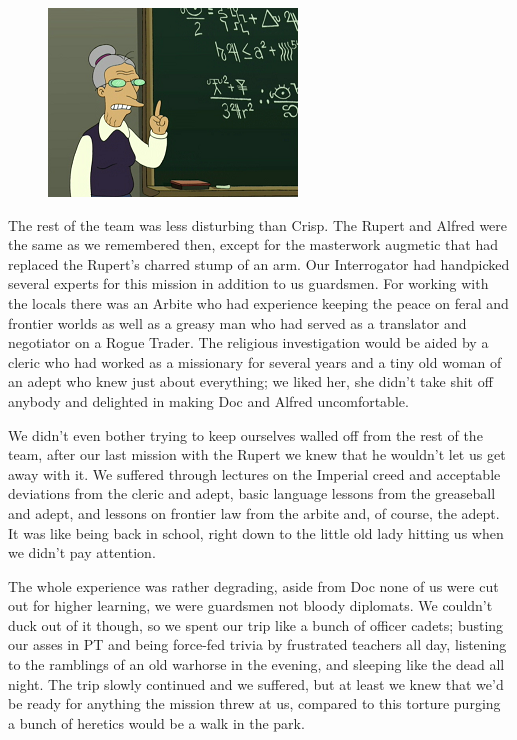\begin{figure}
	\begin{center}
		\includegraphics[width=\figwidth]{pics/6/4.png}
	\end{center}
\end{figure}
The rest of the team was less disturbing than Crisp. 
The Rupert and Alfred were the same as we remembered then, except for the masterwork augmetic that had replaced the Rupert's charred stump of an arm. 
Our Interrogator had handpicked several experts for this mission in addition to us guardsmen. 
For working with the locals there was an Arbite who had experience keeping the peace on feral and frontier worlds as well as a greasy man who had served as a translator and negotiator on a Rogue Trader. 
The religious investigation would be aided by a cleric who had worked as a missionary for several years and a tiny old woman of an adept who knew just about everything; 
we liked her, she didn't take shit off anybody and delighted in making Doc and Alfred uncomfortable.

We didn't even bother trying to keep ourselves walled off from the rest of the team, after our last mission with the Rupert we knew that he wouldn't let us get away with it. 
We suffered through lectures on the Imperial creed and acceptable deviations from the cleric and adept, basic language lessons from the greaseball and adept, and lessons on frontier law from the arbite and, of course, the adept. 
It was like being back in school, right down to the little old lady hitting us when we didn't pay attention.

The whole experience was rather degrading, aside from Doc none of us were cut out for higher learning, we were guardsmen not bloody diplomats. 
We couldn't duck out of it though, so we spent our trip like a bunch of officer cadets; 
busting our asses in PT and being force-fed trivia by frustrated teachers all day, listening to the ramblings of an old warhorse in the evening, and sleeping like the dead all night. 
The trip slowly continued and we suffered, but at least we knew that we'd be ready for anything the mission threw at us, compared to this torture purging a bunch of heretics would be a walk in the park.

